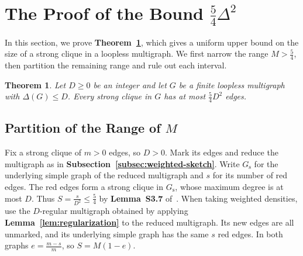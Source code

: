 \documentclass[preprint,11pt,numbers]{elsarticle-arxiv}
\numberwithin{equation}{section}
\newtheorem{theorem}{Theorem}[section]
\theoremstyle{definition}
\begin{document}
\section{The Proof of the Bound \texorpdfstring{$\frac{5}{4}\Delta^2$}{5 Delta squared / 4}}
\label{sec:uniform}

In this section, we prove \textbf{Theorem~\ref{prop:multi-uniform}}, which
gives a uniform upper bound on the size of a strong clique in a loopless
multigraph. We first narrow the range $M>\frac{5}{4}$, then partition
the remaining range and rule out each interval.

\begin{theorem}\label{prop:multi-uniform}
Let $D\geq0$ be an integer and let $G$ be a finite loopless multigraph
with $\Delta(G)\leq D$. Every strong clique in $G$ has at most
$\frac{5}{4}D^2$ edges.
\end{theorem}

\subsection{Partition of the Range of \texorpdfstring{$M$}{M}}
\label{subsec:uniform-partition}

Fix a strong clique of $m>0$ edges, so $D>0$. Mark its edges and
reduce the multigraph as in \textbf{Subsection~\ref{subsec:weighted-sketch}}.
Write $G_{\mathrm s}$ for the underlying simple graph of the
reduced multigraph and $s$ for its number of red edges. The red edges
form a strong clique in $G_{\mathrm s}$, whose maximum degree is at
most $D$. Thus $S=\frac{s}{D^2}\leq\frac{5}{4}$ by
\textbf{Lemma~S3.7} of~\cite{FGSTSupplement}.
When taking weighted densities, use the $D$-regular multigraph
obtained by applying \textbf{Lemma~\ref{lem:regularization}} to
the reduced multigraph. Its new edges are all unmarked, and its
underlying simple graph has the same $s$ red edges.
In both graphs $e=\frac{m-s}{m}$, so $S=M(1-e)$.
\end{document}

